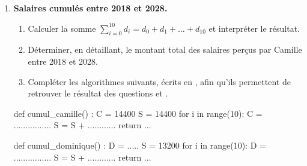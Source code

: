 \documentclass[a4paper,11pt]{article}
\begin{document}
\begin{enumerate}
	\item \textbf{Salaires cumulés entre 2018 et 2028.}
	\begin{enumerate}
		\item Calculer la somme $\sum_{i=0}^{10} d_i = d_0+d_1+\ldots+d_{10}$ et interpréter le résultat.
		\item Déterminer, en détaillant, le montant total des salaires perçus par Camille entre 2018 et 2028.
		\item Compléter les algorithmes suivants, écrits en \calgpython, afin qu'ils permettent de retrouver le résultat des questions  et .
	\end{enumerate}
	\begin{minipage}{0.45\textwidth}
		\begin{envpython}[8.5cm]
			def cumul_camille() : 
				C = 14400
				S = 14400 
				for i in range(10):
					C = ................
					S = S + ............
				return ...
		\end{envpython}
	\end{minipage}\hfill
	\begin{minipage}{0.45\textwidth}
		\begin{envpython}[8.5cm]
			def cumul_dominique() : 
				D = .....
				S = 13200 
				for i in range(10):
					D = ................
					S = S + ............
				return ...
		\end{envpython}
	\end{minipage}
\end{enumerate}
\end{document}
